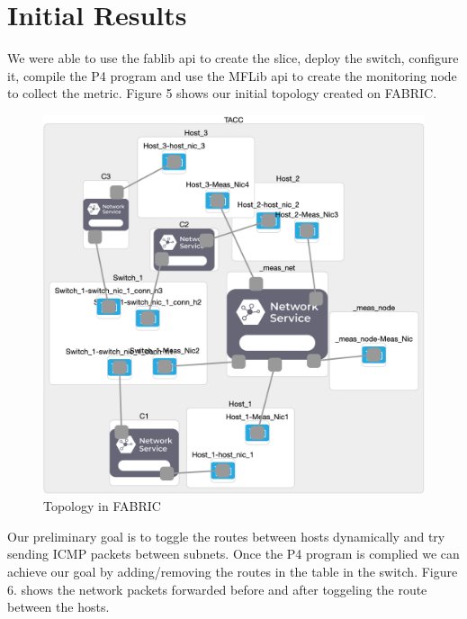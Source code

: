 \documentclass[conference]{IEEEtran}
\begin{document}
    \section{Initial Results}
    We were able to use the fablib api to create the slice, deploy the switch, configure it, compile the P4 program and use the MFLib api to create the monitoring node to collect the metric. Figure 5 shows our initial topology created on FABRIC.

    \begin{figure}[h!]
        \centering
        \includegraphics[scale=0.1]{P4DynamicRouting.png}
        \caption{Topology in FABRIC}
        \label{fig}
    \end{figure}

    Our preliminary goal is to toggle the routes between hosts dynamically and try sending ICMP packets between subnets. Once the P4 program is complied we can achieve our goal by adding/removing the routes in the table in the switch. Figure 6. shows the network packets forwarded before and after toggeling the route between the hosts.
\end{document}
